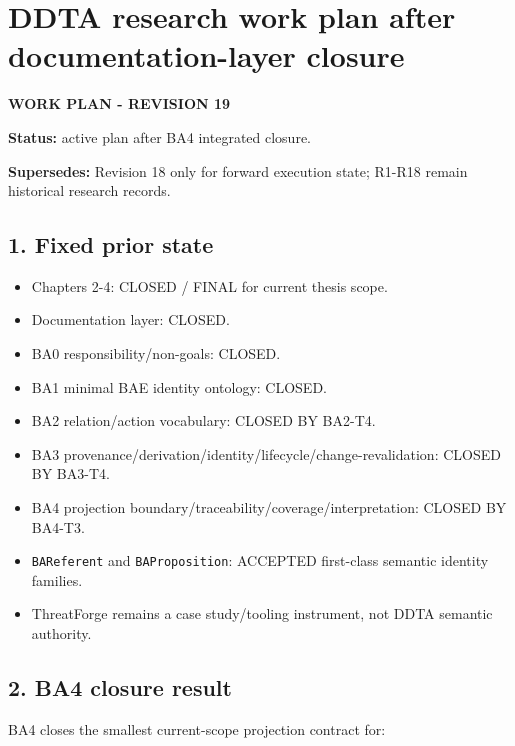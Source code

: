 \documentclass[
  11pt,
  a4paper,
]{article}
\author{}
\date{}
\providecommand{\tightlist}{%
  \setlength{\itemsep}{0pt}\setlength{\parskip}{0pt}}
\begin{document}
\section{DDTA research work plan after documentation-layer
closure}\label{ddta-research-work-plan-after-documentation-layer-closure}

\textbf{WORK PLAN - REVISION 19}

\textbf{Status:} active plan after BA4 integrated closure.

\textbf{Supersedes:} Revision 18 only for forward execution state;
R1-R18 remain historical research records.

\subsection{1. Fixed prior state}\label{fixed-prior-state}

\begin{itemize}
\tightlist
\item
  Chapters 2-4: CLOSED / FINAL for current thesis scope.
\item
  Documentation layer: CLOSED.
\item
  BA0 responsibility/non-goals: CLOSED.
\item
  BA1 minimal BAE identity ontology: CLOSED.
\item
  BA2 relation/action vocabulary: CLOSED BY BA2-T4.
\item
  BA3 provenance/derivation/identity/lifecycle/change-revalidation:
  CLOSED BY BA3-T4.
\item
  BA4 projection boundary/traceability/coverage/interpretation: CLOSED
  BY BA4-T3.
\item
  \texttt{BAReferent} and \texttt{BAProposition}: ACCEPTED first-class
  semantic identity families.
\item
  ThreatForge remains a case study/tooling instrument, not DDTA semantic
  authority.
\end{itemize}

\subsection{2. BA4 closure result}\label{ba4-closure-result}

BA4 closes the smallest current-scope projection contract for:
\end{document}
